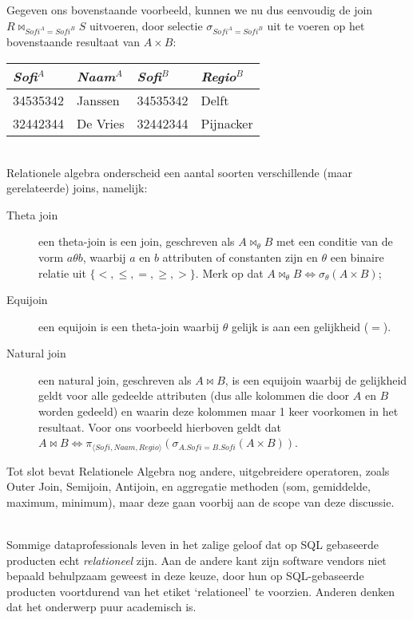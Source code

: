 \begin{aside}
Gegeven ons bovenstaande voorbeeld, kunnen we nu dus eenvoudig de join $R\Join_{Sofi^A=Sofi^B}S$ uitvoeren, door selectie $\sigma_{Sofi^A=Sofi^B}$ uit te voeren op het bovenstaande resultaat van $A\times B$:\\[2.5pt]
\begin{tabular}{|l|l|l|l|}
\hline
\textit{Sofi}$^A$ & \textit{Naam}$^A$ & \textit{Sofi}$^B$ & \textit{Regio}$^B$\\
\hline
34535342 & Janssen & 34535342 & Delft\\
32442344 & De Vries & 32442344 & Pijnacker\\
\hline
\end{tabular}\\[2.5pt]
Relationele algebra onderscheid een aantal soorten verschillende (maar gerelateerde) joins, namelijk:
\begin{description}
\item[Theta join] een theta-join is een join, geschreven als $A\Join_\theta B$ met een conditie van de vorm $a \theta b$, waarbij $a$ en $b$ attributen of constanten zijn en $\theta$ een binaire relatie uit $\{ <, \leq, =, \geq, > \}$. Merk op dat $A\Join_\theta B \Leftrightarrow \sigma_\theta(A\times B)$;
\item[Equijoin] een equijoin is een theta-join waarbij $\theta$ gelijk is aan een gelijkheid ($=$).
\item[Natural join] een natural join, geschreven als $A\Join B$, is een equijoin waarbij de gelijkheid geldt voor alle gedeelde attributen (dus alle kolommen die door $A$ en $B$ worden gedeeld) en waarin deze kolommen maar 1 keer voorkomen in het resultaat. Voor ons voorbeeld hierboven geldt dat $A\Join B\Leftrightarrow \pi_{\langle Sofi,Naam,Regio\rangle}(\sigma_{A.Sofi=B.Sofi}(A\times B))$.
\end{description}

Tot slot bevat Relationele Algebra nog andere, uitgebreidere operatoren, zoals Outer Join, Semijoin, Antijoin, en aggregatie methoden (som, gemiddelde, maximum, minimum), maar deze gaan voorbij aan de scope van deze discussie.

\begin{aside}\mbox{}\\
Sommige dataprofessionals leven in het zalige geloof dat op SQL gebaseerde producten echt \textit{relationeel} zijn. Aan de andere kant zijn software vendors niet bepaald behulpzaam geweest in deze keuze, door hun op SQL-gebaseerde producten voortdurend van het etiket `relationeel' te voorzien. Anderen denken dat het onderwerp puur academisch is.


\end{aside}
\end{aside}
